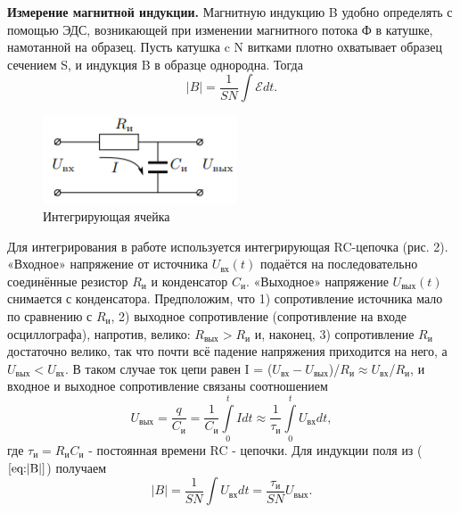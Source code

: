 \documentclass[a4paper, 12pt]{article}
\begin{document}
\textbf{Измерение магнитной индукции.} Магнитную индукцию B удобно
определять с помощью ЭДС, возникающей при изменении магнитного
потока Ф в катушке, намотанной на образец. Пусть катушка c N витками плотно охватывает образец сечением S, и индукция B в образце
однородна. Тогда
\begin{equation}
    |B|=\frac{1}{SN}\int\mathcal{E} dt.
    \label{eq:|B|}
\end{equation}
\begin{figure}
    \includegraphics[width=\linewidth]{int.png}
    \caption{Интегрирующая ячейка}
    \label{fig:int}
\end{figure}

Для интегрирования в работе используется интегрирующая RC-цепочка (рис. 2).
«Входное» напряжение от источника $U_{вх}(t)$ подаётся на последовательно соединённые резистор $R_и$ и конденсатор $C_и$. «Выходное»
напряжение $U_{вых}(t)$ снимается с конденсатора.
 Предположим, что 1) сопротивление источника мало по сравнению с $R_и$,
  2) выходное сопротивление (сопротивление на входе осциллографа), напротив, велико: $R_{вых} > R_и$ и, наконец, 3) сопротивление $R_и$ достаточно велико, так что почти всё падение напряжения приходится на него, а $U_{вых} < U_{вх}$. В таком случае ток цепи равен I = ($U_{вх} - U_{вых}$)/$R_и \approx U_{вх}$/$R_и$, и входное и выходное сопротивление связаны соотношением
\begin{equation}
    U_{вых} = \frac{q}{C_и} = \frac{1}{C_и}\int\limits_0^t Idt \approx \frac{1}{\tau_и} \int\limits_0^t U_{вх}dt,
    \label{eq:U_ext}
\end{equation}
где $\tau_и=R_иC_и$ - постоянная времени RC - цепочки. Для индукции поля из ($\ref{eq:|B|}$) получаем 
\begin{equation}
    |B|=\frac{1}{SN}\int U_{вх} dt=\frac{\tau_и}{SN}U_{вых}.
    \label{eq:|B|new}
\end{equation}
\end{document}
